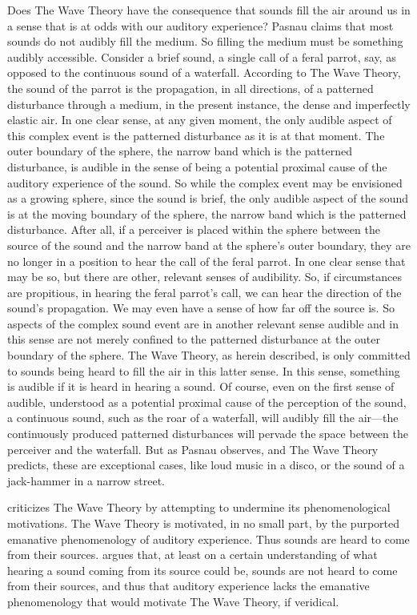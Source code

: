 Does The Wave Theory have the consequence that sounds fill the air around us in a sense that is at odds with our auditory experience? Pasnau claims that most sounds do not audibly fill the medium. So filling the medium must be something audibly accessible. Consider a brief sound, a single call of a feral parrot, say, as opposed to the continuous sound of a waterfall. According to The Wave Theory, the sound of the parrot is the propagation, in all directions, of a patterned disturbance through a medium, in the present instance, the dense and imperfectly elastic air. In one clear sense, at any given moment, the only audible aspect of this complex event is the patterned disturbance as it is at that moment. The outer boundary of the sphere, the narrow band which is the patterned disturbance, is audible in the sense of being a potential proximal cause of the auditory experience of the sound. So while the complex event may be envisioned as a growing sphere, since the sound is brief, the only audible aspect of the sound is at the moving boundary of the sphere, the narrow band which is the patterned disturbance. After all, if a perceiver is placed within the sphere between the source of the sound and the narrow band at the sphere's outer boundary, they are no longer in a position to hear the call of the feral parrot. In one clear sense that may be so, but there are other, relevant senses of audibility. So, if circumstances are propitious, in hearing the feral parrot's call, we can hear the direction of the sound's propagation. We may even have a sense of how far off the source is. So aspects of the complex sound event are in another relevant sense audible and in this sense are not merely confined to the patterned disturbance at the outer boundary of the sphere. The Wave Theory, as herein described, is only committed to sounds being heard to fill the air in this latter sense. In this sense, something is audible if it is heard in hearing a sound. Of course, even on the first sense of audible, understood as a potential proximal cause of the perception of the sound, a continuous sound, such as the roar of a waterfall, will audibly fill the air---the continuously produced patterned disturbances will pervade the space between the perceiver and the waterfall. But as Pasnau observes, and The Wave Theory predicts, these are exceptional cases, like loud music in a disco, or the sound of a jack-hammer in a narrow street.

\citet[chapter 3.4]{OCallaghan:2007xy} criticizes The Wave Theory by attempting to undermine its phenomenological motivations. The Wave Theory is motivated, in no small part, by the purported emanative phenomenology of auditory experience. Thus sounds are heard to come from their sources. \citet{OCallaghan:2007xy,OCallaghan:2009aa} argues that, at least on a certain understanding of what hearing a sound coming from its source could be, sounds are not heard to come from their sources, and thus that auditory experience lacks the emanative phenomenology that would motivate The Wave Theory, if veridical.

